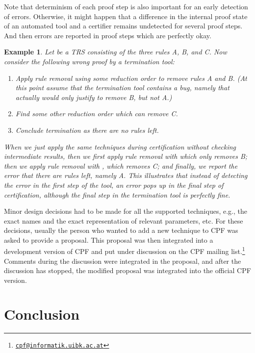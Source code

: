 \documentclass[USenglish]{eptcs}
\newtheorem{example}{Example}
\begin{document}
Note that determinism of each proof step is also important for an early detection
of errors. Otherwise, it might happen that a difference in the internal proof 
state of an automated tool and a certifier remains 
undetected for several proof steps. And then errors are reported in proof steps 
which are perfectly okay.

\begin{example}
Let  be a TRS consisting of the three rules A, B, and C.
Now consider the following wrong proof by a termination tool:
\begin{enumerate}
\item
Apply rule removal using some reduction order  to remove rules A and B.
(At this point assume that the termination tool contains a bug, namely that
actually  would only justify to remove B, but not A.)

\item
Find some other reduction order  which can remove C.
\item
Conclude termination as there are no rules left.
\end{enumerate}

When we just apply the same techniques during certification without checking
intermediate results, then we first apply rule removal with  which only
removes B; then we apply rule removal with , which removes C; and
finally, we report the error that there are rules left, namely A.  This
illustrates that instead of detecting the error in the first step of the tool,
an error pops up in the final step of certification, although the final step in
the termination tool is perfectly fine.
\end{example}

Minor design decisions had to be made for all the supported 
techniques,
e.g., the exact names and the exact representation of relevant parameters, etc.
For these decisions, usually the person who wanted to add a new technique to CPF was
asked to provide a proposal. This proposal was then integrated into a development 
version of CPF and put under discussion on the CPF mailing list.\footnote{\href{mailto:cpf@informatik.uibk.ac.at}{\nolinkurl{cpf@informatik.uibk.ac.at}}}
Comments during
the discussion were integrated in the proposal, 
and after the discussion has stopped, the modified proposal was
integrated into the official CPF version. 


\section{Conclusion}
\end{document}
